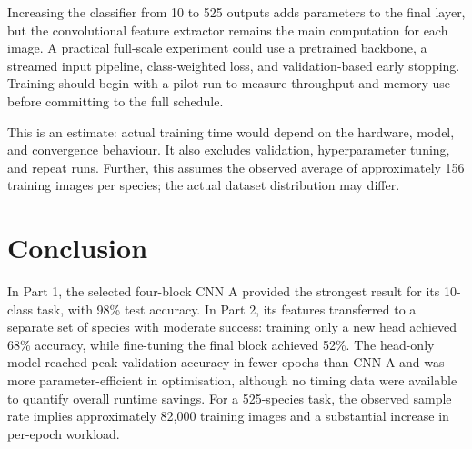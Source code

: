 \documentclass[11pt,a4paper]{article}
\begin{document}
Increasing the classifier from 10 to 525 outputs adds parameters to the final layer, but the
convolutional feature extractor remains the main computation for each image. A practical
full-scale experiment could use a pretrained backbone, a streamed input pipeline,
class-weighted loss, and validation-based early stopping. Training should begin with a
pilot run to measure throughput and memory use before committing to the full schedule.

This is an estimate: actual training time would depend on the hardware, model, and convergence behaviour. It also
excludes validation, hyperparameter tuning, and repeat runs. Further, this assumes the observed average of approximately 156 training images per
species; the actual dataset distribution may differ.

\section{Conclusion}
In Part 1, the selected four-block CNN A provided the strongest result for its 10-class task, with
98\% test accuracy. In Part 2, its features transferred to a separate set of species with moderate
success: training only a new head achieved 68\% accuracy, while fine-tuning the final
block achieved 52\%. The head-only model reached peak validation accuracy in fewer
epochs than CNN A and was more parameter-efficient in optimisation, although no timing
data were available to quantify overall runtime savings. For a 525-species task, the observed
sample rate implies approximately 82,000 training images and a substantial increase in
per-epoch workload.
\end{document}

